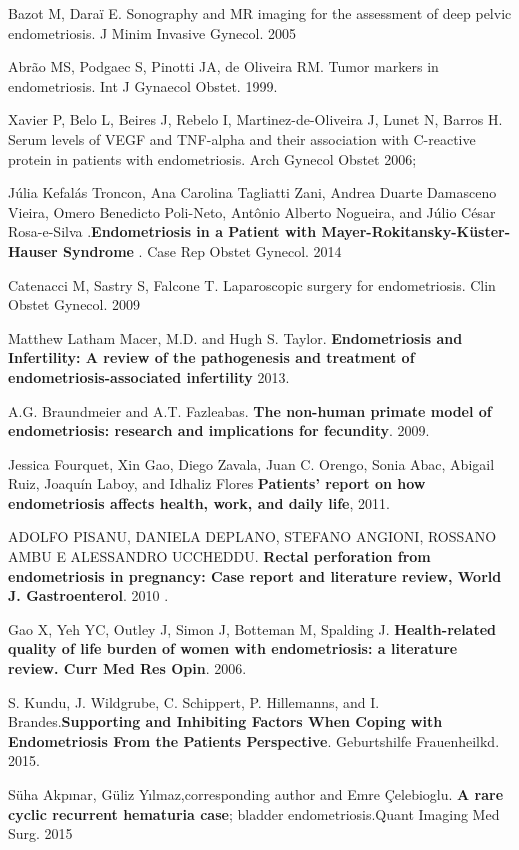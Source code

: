 \documentclass[12pt]{article} %
\begin{document}
Bazot M, Daraï E. Sonography and MR imaging for the
assessment of deep pelvic endometriosis. J Minim Invasive
Gynecol. 2005

Abrão MS, Podgaec S, Pinotti JA, de Oliveira RM. Tumor markers
in endometriosis. Int J Gynaecol Obstet. 1999.

Xavier P, Belo L, Beires J, Rebelo I, Martinez-de-Oliveira J, Lunet N, Barros H.
Serum levels of VEGF and TNF-alpha and their association with C-reactive protein in patients with endometriosis. Arch Gynecol Obstet 2006;

Júlia Kefalás Troncon, Ana Carolina Tagliatti Zani, Andrea Duarte Damasceno Vieira, Omero Benedicto Poli-Neto, Antônio Alberto Nogueira, and Júlio César Rosa-e-Silva .\textbf{Endometriosis in a Patient with Mayer-Rokitansky-Küster-Hauser Syndrome} . Case Rep Obstet Gynecol. 2014

Catenacci M, Sastry S, Falcone T. Laparoscopic surgery for endometriosis. Clin Obstet Gynecol. 2009

Matthew Latham Macer, M.D. and Hugh S. Taylor. \textbf{Endometriosis and Infertility: A review of the pathogenesis and treatment of endometriosis-associated infertility} 2013.

A.G. Braundmeier and A.T. Fazleabas. \textbf{The non-human primate model of endometriosis: research and implications for fecundity}. 2009.

Jessica Fourquet, Xin Gao, Diego Zavala, Juan C. Orengo, Sonia Abac, Abigail Ruiz, Joaquín Laboy, and Idhaliz Flores\textbf{ Patients’ report on how endometriosis affects health, work, and daily life}, 2011.


ADOLFO PISANU, DANIELA DEPLANO, STEFANO ANGIONI, ROSSANO AMBU E ALESSANDRO UCCHEDDU. \textbf{Rectal perforation from endometriosis in pregnancy: Case report and literature review, World J. Gastroenterol}. 2010 .

Gao X, Yeh YC, Outley J, Simon J, Botteman M, Spalding J. \textbf{Health-related quality of life burden of women with endometriosis: a literature review. Curr Med Res Opin}. 2006.

S. Kundu, J. Wildgrube, C. Schippert, P. Hillemanns, and I. Brandes.\textbf{Supporting and Inhibiting Factors When Coping with Endometriosis From the Patients Perspective}. Geburtshilfe Frauenheilkd. 2015.

Süha Akpınar, Güliz Yılmaz,corresponding author and Emre Çelebioglu.\textbf{ A rare cyclic recurrent hematuria case}; bladder endometriosis.Quant Imaging Med Surg. 2015 
\end{document}
